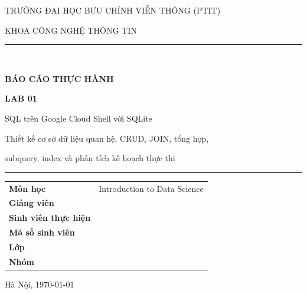 \documentclass[12pt,a4paper]{article}
\begin{document}
\begin{titlepage}
\centering
\vspace*{1.0cm}

{\large TRƯỜNG ĐẠI HỌC BƯU CHÍNH VIỄN THÔNG (PTIT)\par}
\vspace{0.2cm}
{\large KHOA CÔNG NGHỆ THÔNG TIN\par}

\vspace{1.6cm}
{\color{blue!45!black}\rule{\linewidth}{0.6pt}}\\[0.7cm]
{\Huge\bfseries BÁO CÁO THỰC HÀNH\par}
\vspace{0.6cm}
{\LARGE\bfseries LAB 01\par}
\vspace{0.4cm}
{\Large SQL trên Google Cloud Shell với SQLite\par}
\vspace{0.5cm}
{\large Thiết kế cơ sở dữ liệu quan hệ, CRUD, JOIN, tổng hợp,\par}
{\large subquery, index và phân tích kế hoạch thực thi\par}
\vspace{0.7cm}
{\color{blue!45!black}\rule{\linewidth}{0.6pt}}

\vspace{1.8cm}
\begin{minipage}{0.78\linewidth}
\large
\begin{tabular}{@{}ll@{}}
\textbf{Môn học}            & Introduction to Data Science \\
\textbf{Giảng viên}         & \dotfill \\
\textbf{Sinh viên thực hiện}& \dotfill \\
\textbf{Mã số sinh viên}    & \dotfill \\
\textbf{Lớp}                & \dotfill \\
\textbf{Nhóm}               & \dotfill \\
\end{tabular}
\end{minipage}

\vfill
{\large Hà Nội, \today\par}
\end{titlepage}

\end{document}
